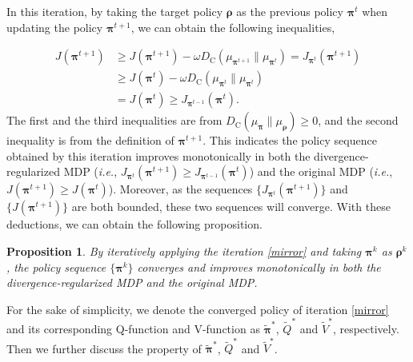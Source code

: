 \documentclass{article}
\newtheorem{proposition}{Proposition}
\begin{document}
In this iteration, by taking the target policy $\bm{\rho}$ as the previous policy $\bm{\pi}^t$ when updating the policy $\bm{\pi}^{t+1}$, we can obtain the following inequalities,
\iffalse
$$
J(\boldsymbol{\pi}^{t + 1}) \ge J(\boldsymbol{\pi}^{t + 1}) - \omega D_{\operatorname{C}} \left( \mu_{\boldsymbol{\pi}^{t+1}} \| \mu_{{\boldsymbol{\pi}}^t} \right) \ge J(\boldsymbol{\pi}^{t }) - \omega D_{\operatorname{C}} \left( \mu_{\boldsymbol{\pi}^{t}} \| \mu_{{\boldsymbol{\pi}}^t} \right) = J(\boldsymbol{\pi}^{t }).
$$
\fi
\begin{align*}
    J(\boldsymbol{\pi}^{t + 1})
    & \ge J(\boldsymbol{\pi}^{t + 1}) - \omega D_{\operatorname{C}} \left( \mu_{\boldsymbol{\pi}^{t+1}} \| \mu_{{\boldsymbol{\pi}}^t} \right) =  J_{{\boldsymbol{\pi}}^t}(\boldsymbol{\pi}^{t + 1}) \\ 
    & \ge J(\boldsymbol{\pi}^{t }) - \omega D_{\operatorname{C}} \left( \mu_{\boldsymbol{\pi}^{t}} \| \mu_{{\boldsymbol{\pi}}^t} \right) \\
    & =  J(\boldsymbol{\pi}^{t}) \ge  J_{{\boldsymbol{\pi}}^{t-1}}(\boldsymbol{\pi}^{t}).
\end{align*}
The first and the third inequalities are from $D_{\operatorname{C}} \left( \mu_{\boldsymbol{\pi}} \| \mu_{{\boldsymbol{\rho}}} \right) \ge 0$, and the second inequality is from the definition of $\boldsymbol{\pi}^{t + 1}$. This indicates the policy sequence obtained by this iteration improves monotonically in both the divergence-regularized MDP (\textit{i.e.}, $ J_{{\boldsymbol{\pi}}^t}(\boldsymbol{\pi}^{t + 1}) \ge J_{{\boldsymbol{\pi}}^{t-1}}(\boldsymbol{\pi}^{t})$) and the original MDP (\textit{i.e.}, $ J(\boldsymbol{\pi}^{t+1}) \ge J(\boldsymbol{\pi}^{t})$). Moreover, as the sequences $\{ J_{{\boldsymbol{\pi}}^t}(\boldsymbol{\pi}^{t + 1})\}$ and $\{ J(\boldsymbol{\pi}^{t + 1})\}$ are both bounded, these two sequences will converge. With these deductions, we can obtain the following proposition.
\begin{proposition} \label{monotonic_converge}
    By iteratively applying the iteration \eqref{mirror} and taking $\bm{\pi}^{k}$ as $\bm{\rho}^k$, the policy sequence $\{\bm{\pi}^k\}$ converges and improves monotonically in both the divergence-regularized MDP and the original MDP.
\end{proposition} 
For the sake of simplicity, we denote the converged policy of iteration \eqref{mirror} and its corresponding Q-function and V-function as $\tilde{\bm{\pi}}^{*}$, $\tilde{Q}^{*}$ and $\tilde{V}^{*}$, respectively. Then we further discuss the property of $\tilde{\bm{\pi}}^{*}$, $\tilde{Q}^{*}$ and $\tilde{V}^{*}$.
\end{document}
